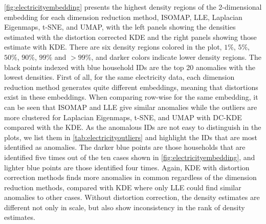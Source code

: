 \documentclass[
]{article}
\begin{document}
\autoref{fig:electricityembedding} presents the highest density regions
of the 2-dimensional embedding for each dimension reduction method,
ISOMAP, LLE, Laplacian Eigenmaps, t-SNE, and UMAP, with the left panels
showing the densities estimated with the distortion corrected KDE and
the right panels showing those estimate with KDE. There are six density
regions colored in the plot, \(1\%\), \(5\%\), \(50\%\), \(90\%\),
\(99\%\) and \(>99\%\), and darker colors indicate lower density
regions. The black points indexed with blue household IDs are the top 20
anomalies with the lowest densities. First of all, for the same
electricity data, each dimension reduction method generates quite
different embeddings, meaning that distortions exist in these
embeddings. When comparing row-wise for the same embedding, it can be
seen that ISOMAP and LLE give similar anomalies while the outliers are
more clustered for Laplacian Eigenmaps, t-SNE, and UMAP with DC-KDE
compared with the KDE. As the anomalous IDs are not easy to distinguish
in the plots, we list them in \autoref{tab:electricityoutliers} and
highlight the IDs that are most identified as anomalies. The darker blue
points are those households that are identified five times out of the
ten cases shown in \autoref{fig:electricityembedding}, and lighter blue
points are those identified four times. Again, KDE with distortion
correction methods finds more anomalies in common regardless of the
dimension reduction methods, compared with KDE where only LLE could find
similar anomalies to other cases. Without distortion correction, the
density estimates are different not only in scale, but also show
inconsistency in the rank of density estimates.
\end{document}
